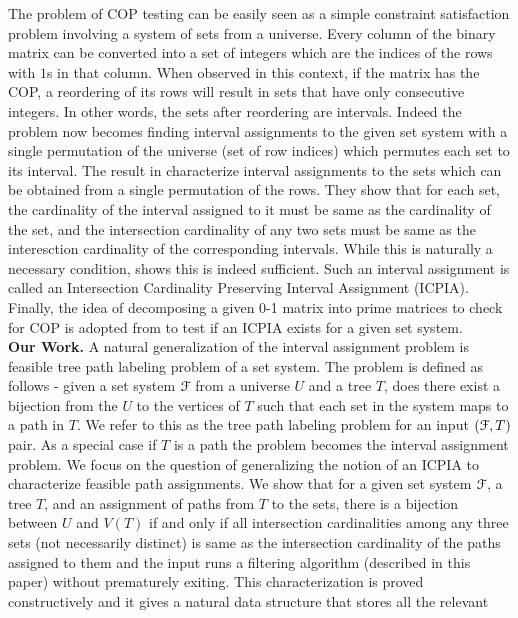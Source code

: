 \documentclass[a4paper,UKenglish,numberwithinsect]{lipics} %
\def\cF{{\cal F}}
\begin{document}
\noindent
The problem of COP testing can be easily seen as a simple constraint
satisfaction problem involving a system of sets from a universe. Every
column of the binary matrix can be converted into a set of integers
which are the indices of the rows with $1$s in that column. When
observed in this context, if the matrix has the COP, a reordering of
its rows will result in sets that have only consecutive integers. In
other words, the sets after reordering are intervals. Indeed the
problem now becomes finding interval assignments to the given set
system \cite{nsnrs09} with a single permutation of the universe (set
of row indices) which permutes each set to its interval. The result in
\cite{nsnrs09} characterize interval assignments to the sets which can
be obtained from a single permutation of the rows.  They show that for
each set, the cardinality of the interval assigned to it must be same
as the cardinality of the set, and the intersection cardinality of any
two sets must be same as the interesction cardinality of the
corresponding intervals.  While this is naturally a necessary
condition, \cite{nsnrs09} shows this is indeed sufficient.  Such an
interval assignment is called an Intersection Cardinality Preserving
Interval Assignment (ICPIA).  Finally, the idea of decomposing a given
0-1 matrix into prime matrices to check for COP is adopted from
\cite{wlh02} to test if an ICPIA exists for a given set system.\\
{\bf Our Work.}  A natural generalization of the interval assignment
problem is feasible tree path labeling problem of a set system. The
problem is defined as follows - given a set system $\cF$ from a
universe $U$ and a tree $T$, does there exist a bijection from the $U$
to the vertices of $T$ such that each set in the system maps to a path
in $T$.  We refer to this as the tree path labeling problem for an
input $(\cF,T)$ pair. As a special case if $T$ is a path the problem
becomes the interval assignment problem.  We focus on the question of
generalizing the notion of an ICPIA \cite{nsnrs09} to characterize
feasible path assignments.  We show that for a given set system $\cF$,
a tree $T$, and an assignment of paths from $T$ to the sets, there is
a bijection between $U$ and $V(T)$ if and only if all intersection
cardinalities among any three sets (not necessarily distinct) is same
as the intersection cardinality of the paths assigned to them and the
input runs a filtering algorithm (described in this paper) without
prematurely exiting.  This characterization is proved constructively
and it gives a natural data structure that stores all the relevant
\end{document}
